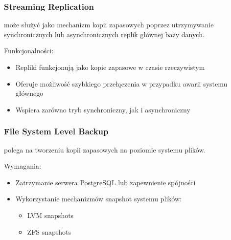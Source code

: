 \documentclass[a4paper,11pt,openany,english]{sphinxmanual}
\begin{document}
\subsubsection{Streaming Replication}
\label{\detokenize{rozdzial2/Kopie_zapasowe_i_odzyskiwanie_danych/kopie_zapasowe_i_odzyskiwanie_danych:streaming-replication}}
\sphinxAtStartPar
{} może służyć jako mechanizm kopii zapasowych poprzez utrzymywanie synchronicznych lub asynchronicznych replik głównej bazy danych.

\sphinxAtStartPar
Funkcjonalności:
\begin{itemize}
\item {} 
\sphinxAtStartPar
Repliki funkcjonują jako kopie zapasowe w czasie rzeczywistym

\item {} 
\sphinxAtStartPar
Oferuje możliwość szybkiego przełączenia w przypadku awarii systemu głównego

\item {} 
\sphinxAtStartPar
Wspiera zarówno tryb synchroniczny, jak i asynchroniczny

\end{itemize}


\subsubsection{File System Level Backup}
\label{\detokenize{rozdzial2/Kopie_zapasowe_i_odzyskiwanie_danych/kopie_zapasowe_i_odzyskiwanie_danych:file-system-level-backup}}
\sphinxAtStartPar
{} polega na tworzeniu kopii zapasowych na poziomie systemu plików.

\sphinxAtStartPar
Wymagania:
\begin{itemize}
\item {} 
\sphinxAtStartPar
Zatrzymanie serwera PostgreSQL lub zapewnienie spójności

\item {} 
\sphinxAtStartPar
Wykorzystanie mechanizmów snapshot systemu plików:
\begin{itemize}
\item {} 
\sphinxAtStartPar
LVM snapshots

\item {} 
\sphinxAtStartPar
ZFS snapshots

\end{itemize}

\end{itemize}
\end{document}
